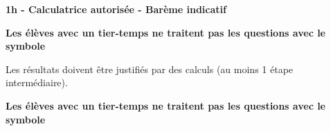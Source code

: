 \documentclass[12pt,a4paper]{article}  %
\begin{document}
\graphicspath{{images/}}

\begin{center}

\end{center}


\begin{center}\textbf{1h - Calculatrice autorisée - Barème indicatif}\end{center}

\begin{center}\textbf{Les élèves avec un tier-temps ne traitent pas les questions avec  le symbole }\end{center}

\begin{center}
Les résultats doivent être justifiés par des calculs (au moins 1 étape intermédiaire).
\end{center}

\begin{center}\textbf{Les élèves avec un tier-temps ne traitent pas les questions avec  le symbole }\end{center}
\end{document}
